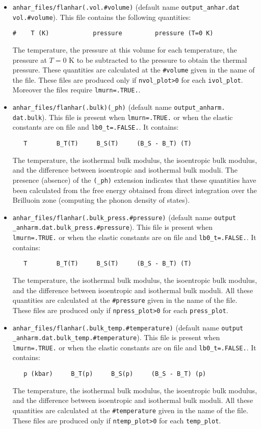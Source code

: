 \documentclass[12pt,a4paper,twoside]{report}
\begin{document}
\begin{itemize}
\item
\texttt{anhar\_files/flanhar(.vol.\#volume)} (default name \texttt{output\_anhar.dat} \texttt{vol.\#volume}).
This file contains the following quantities:
\begin{verbatim}
#    T (K)            pressure         pressure (T=0 K) 
\end{verbatim}
The temperature, the pressure at this volume for each temperature, the
pressure at $T=0$ K to be subtracted to the pressure to obtain the
thermal pressure.
These quantities are calculated at the \texttt{\#volume} given in the name 
of the file.
These files are produced only if \texttt{nvol\_plot>0} for each
\texttt{ivol\_plot}. Moreover the files require \texttt{lmurn=.TRUE.}.

\item \texttt{anhar\_files/flanhar(.bulk)(\_ph)} 
(default name \texttt{output\_anharm.} \texttt{dat.bulk}).
This file is present when \texttt{lmurn=.TRUE.} or when the elastic
constants are on file and \texttt{lb0\_t=.FALSE.}. It contains:
\begin{verbatim}
   T        B_T(T)     B_S(T)     (B_S - B_T) (T) 
\end{verbatim}
The temperature, the isothermal bulk modulus, the isoentropic bulk modulus,
and the difference between isoentropic and isothermal bulk moduli.
The presence (absence) of the \texttt{(\_ph)} extension indicates that
these quantities have been calculated from the free energy obtained from 
direct integration over the Brilluoin zone (computing the phonon density
of states). 

\item \texttt{anhar\_files/flanhar(.bulk\_press.\#pressure)}
(default name \texttt{output} \texttt{\_anharm.dat.bulk\_press.\#pressure}).
This file is present when \texttt{lmurn=.TRUE.} or when the elastic
constants are on file and \texttt{lb0\_t=.FALSE.}. It contains:
\begin{verbatim}
   T        B_T(T)     B_S(T)     (B_S - B_T) (T) 
\end{verbatim}
The temperature, the isothermal bulk modulus, the isoentropic bulk modulus,
and the difference between isoentropic and isothermal bulk moduli.
All these quantities are calculated at the \texttt{\#pressure} given
in the name of the file.
These files are produced only if \texttt{npress\_plot>0} for each
\texttt{press\_plot}.

\item \texttt{anhar\_files/flanhar(.bulk\_temp.\#temperature)}
(default name \texttt{output} \texttt{\_anharm.dat.bulk\_temp.\#temperature}).
This file is present when \texttt{lmurn=.TRUE.} or when the elastic
constants are on file and \texttt{lb0\_t=.FALSE.}. It contains:
\begin{verbatim}
   p (kbar)     B_T(p)     B_S(p)     (B_S - B_T) (p) 
\end{verbatim}
The temperature, the isothermal bulk modulus, the isoentropic bulk modulus,
and the difference between isoentropic and isothermal bulk moduli.
All these quantities are calculated at the \texttt{\#temperature} given
in the name of the file.
These files are produced only if \texttt{ntemp\_plot>0} for each
\texttt{temp\_plot}.


\end{itemize}
\end{document}
